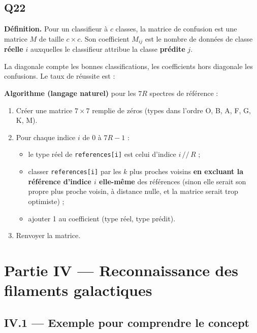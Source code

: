 \documentclass[11pt,a4paper]{article}
\providecommand{\tightlist}{\setlength{\itemsep}{0pt}\setlength{\parskip}{0pt}}
\newcommand{\equationajustee}[1]{%
  \sbox{\boiteequation}{$\displaystyle #1$}%
  \ifdim\wd\boiteequation>\linewidth
    \[\resizebox{\linewidth}{!}{\usebox{\boiteequation}}\]%
  \else
    \[#1\]%
  \fi}
\begin{document}
\hypertarget{q22}{%
\subsection{Q22}\label{q22}}

\textbf{Définition.} Pour un classifieur à \(c\) classes, la matrice de confusion est une matrice \(M\) de taille \(c \times c\). Son coefficient \(M_{ij}\) est le nombre de données de classe \textbf{réelle} \(i\) auxquelles le classifieur attribue la classe \textbf{prédite} \(j\).

La diagonale compte les bonnes classifications, les coefficients hors diagonale les confusions. Le taux de réussite est :

\equationajustee{\tau = \frac{\sum_i M_{ii}}{\sum_{i,j} M_{ij}}}

\textbf{Algorithme (langage naturel)} pour les \(7R\) spectres de référence :

\begin{enumerate}
\def\labelenumi{\arabic{enumi}.}
\tightlist
\item
  Créer une matrice \(7 \times 7\) remplie de zéros (types dans l'ordre O, B, A, F, G, K, M).
\item
  Pour chaque indice \(i\) de 0 à \(7R - 1\) :

  \begin{itemize}
  \tightlist
  \item
    le type réel de \texttt{references{[}i{]}} est celui d'indice \(i \,//\, R\) ;
  \item
    classer \texttt{references{[}i{]}} par les \(k\) plus proches voisins \textbf{en excluant la référence d'indice \(i\) elle-même} des références (sinon elle serait son propre plus proche voisin, à distance nulle, et la matrice serait trop optimiste) ;
  \item
    ajouter 1 au coefficient (type réel, type prédit).
  \end{itemize}
\item
  Renvoyer la matrice.
\end{enumerate}

\hypertarget{partie-iv-reconnaissance-des-filaments-galactiques}{%
\section{Partie IV --- Reconnaissance des filaments galactiques}\label{partie-iv-reconnaissance-des-filaments-galactiques}}

\hypertarget{iv.1-exemple-pour-comprendre-le-concept}{%
\subsection{IV.1 --- Exemple pour comprendre le concept}\label{iv.1-exemple-pour-comprendre-le-concept}}
\end{document}
